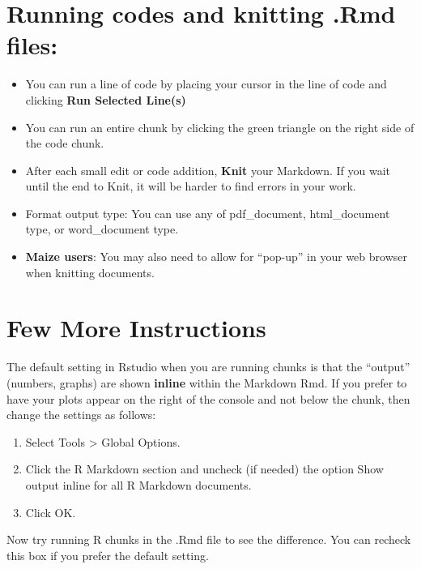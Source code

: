 \documentclass[
]{book}
\providecommand{\tightlist}{%
  \setlength{\itemsep}{0pt}\setlength{\parskip}{0pt}}
\begin{document}
\hypertarget{running-codes-and-knitting-.rmd-files}{%
\section{Running codes and knitting .Rmd files:}\label{running-codes-and-knitting-.rmd-files}}

\begin{itemize}
\item
  You can run a line of code by placing your cursor in the line of code and clicking \textbf{Run Selected Line(s)}
\item
  You can run an entire chunk by clicking the green triangle on the right side of the code chunk.
\item
  After each small edit or code addition, \textbf{Knit} your Markdown. If you wait until the end to Knit, it will be harder to find errors in your work.
\item
  Format output type: You can use any of pdf\_document, html\_document type, or word\_document type.
\item
  \textbf{Maize users}: You may also need to allow for ``pop-up'' in your web browser when knitting documents.
\end{itemize}

\hypertarget{few-more-instructions}{%
\section{Few More Instructions}\label{few-more-instructions}}

The default setting in Rstudio when you are running chunks is that the ``output'' (numbers, graphs) are
shown \textbf{inline} within the Markdown Rmd. If you prefer to have your plots appear on the right of the console and not below the chunk, then change the settings as follows:

\begin{enumerate}
\def\labelenumi{\arabic{enumi}.}
\tightlist
\item
  Select Tools \textgreater{} Global Options.
\item
  Click the R Markdown section and uncheck (if needed) the option Show output inline for all
  R Markdown documents.
\item
  Click OK.
\end{enumerate}

Now try running R chunks in the .Rmd file to see the difference. You can recheck this box if you prefer
the default setting.
\end{document}
